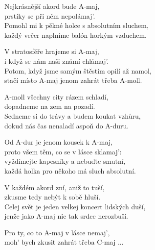 
\ve
{}Nejkrásnější akord bude A-maj,\\
prstíky se při něm nepolámaj'.\\
Pomohl mi k pěkné holce s absolutním sluchem,\\
každý večer naplníme balón horkým vzduchem. 

\ve
V stratosféře hrajeme si A-maj,\\
i když se nám naši známí chlámaj'.\\
Potom, když jsme samým štěstím opilí až namol,\\
stačí místo A-maj jenom zahrát třeba A-moll.

\ve
A-moll všechny city rázem schladí,\\
dopadneme na zem na pozadí.\\
Sedneme si do trávy a budem koukat vzhůru,\\
dokud nás čas nenaladí aspoň do A-duru.

\cho
{}Od A-dur je jenom kousek k A-maj,\\
proto všem těm, co se v lásce sklamaj': \\
vyždímejte kapesníky a nebuďte smutní,\\
každá holka pro někoho má sluch absolutní.

\ve
V každém akord zní, aniž to tuší,\\
zkusme tedy nebýt k sobě hluší.\\
Celej svět je jeden velkej koncert lidských duší,\\
jenže jako A-maj nic tak srdce nerozbuší.

\re{}
Pro ty, co to A-maj v lásce nemaj',\\
moh' bych zkusit zahrát třeba C-maj ...



\esong
